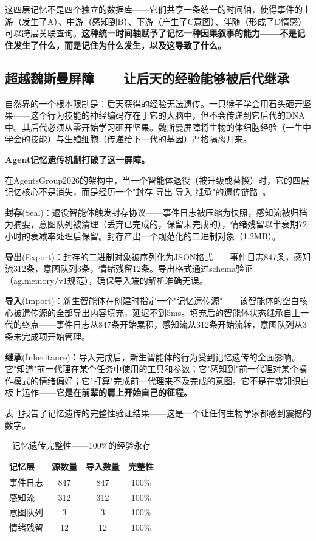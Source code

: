 \documentclass[twocolumn,10.5pt]{ctexart}
\begin{document}
这四层记忆不是四个独立的数据库——它们共享一条统一的时间轴，使得事件的上游（发生了A）、中游（感知到B）、下游（产生了C意图）、伴随（形成了D情感）可以跨层关联查询。\textbf{这种统一时间轴赋予了记忆一种因果叙事的能力——不是记住发生了什么，而是记住为什么发生，以及这导致了什么。}

\subsection{超越魏斯曼屏障——让后天的经验能够被后代继承}

自然界的一个根本限制是：后天获得的经验无法遗传。一只猴子学会用石头砸开坚果——这个行为技能的神经编码存在于它的大脑中，但不会传递到它后代的DNA中。其后代必须从零开始学习砸开坚果。魏斯曼屏障将生物的体细胞经验（一生中学会的技能）与生殖细胞（传递给下一代的基因）严格隔离开来。

\textbf{Agent记忆遗传机制打破了这一屏障。}

在AgentsGroup2026的架构中，当一个智能体退役（被升级或替换）时，它的四层记忆核心不是消失，而是经历一个"封存-导出-导入-继承"的遗传链路~\cite{wang2023voyager}。

\textbf{封存}(Seal)：退役智能体触发封存协议——事件日志被压缩为快照，感知流被归档为摘要，意图队列被清理（丢弃已完成的，保留未完成的），情绪残留以半衰期72小时的衰减率处理后保留。封存产出一个规范化的二进制对象（1.2MB）。

\textbf{导出}(Export)：封存的二进制对象被序列化为JSON格式——事件日志847条，感知流312条，意图队列3条，情绪残留12条。导出格式通过schema验证（ag.memory/v1规范），确保导入端的解析准确无误。

\textbf{导入}(Import)：新生智能体在创建时指定一个"记忆遗传源"——该智能体的空白核心被遗传源的全部导出内容填充，延迟不到5ms。填充后的智能体状态继承自上一代的终点——事件日志从847条开始累积，感知流从312条开始流转，意图队列从3条未完成项开始管理。

\textbf{继承}(Inheritance)：导入完成后，新生智能体的行为受到记忆遗传的全面影响。它"知道"前一代理在某个任务中使用的工具和参数；它"感知到"前一代理对某个操作模式的情绪偏好；它"打算"完成前一代理来不及完成的意图。它不是在零知识白板上运作——\textbf{它是在前辈的肩上开始自己的征程。}

表~\ref{tab:memory_integrity_passionate}报告了记忆遗传的完整性验证结果——这是一个让任何生物学家都感到震撼的数字。

\begin{table}[t]
\centering
\caption{记忆遗传完整性——100\%的经验永存}
\label{tab:memory_integrity_passionate}
\setlength{\tabcolsep}{2pt}
\renewcommand{\arraystretch}{1.15}
\begin{tabular}{lccc}
\toprule
记忆层 & 源数量 & 导入数量 & 完整性 \\
\midrule
事件日志 & 847 & 847 & 100\% \\
感知流 & 312 & 312 & 100\% \\
意图队列 & 3 & 3 & 100\% \\
情绪残留 & 12 & 12 & 100\% \\
\bottomrule
\end{tabular}
\end{table}
\end{document}
